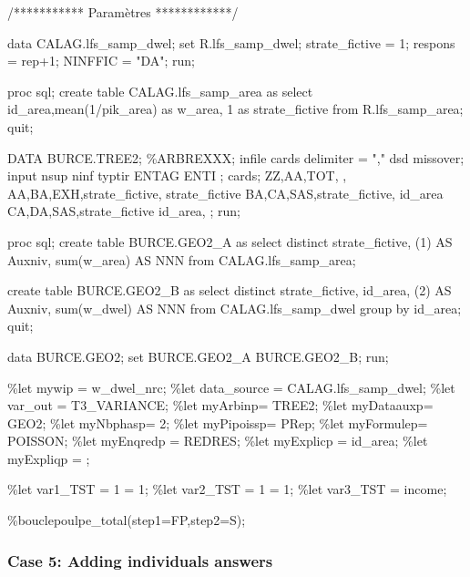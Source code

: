 \documentclass[
]{article}
\newenvironment{Shaded}{\begin{snugshade}}{\end{snugshade}}
\newcommand{\NormalTok}[1]{#1}
\begin{document}
\begin{Shaded}
\begin{Highlighting}[]
\NormalTok{/*********** Paramètres ************/}

\NormalTok{data CALAG.lfs\_samp\_dwel; set R.lfs\_samp\_dwel; }
\NormalTok{strate\_fictive = 1;}
\NormalTok{respons = rep+1;}
\NormalTok{NINFFIC = "DA";}
\NormalTok{run;}

\NormalTok{proc sql; create table CALAG.lfs\_samp\_area as select}
\NormalTok{id\_area,mean(1/pik\_area) as w\_area,}
\NormalTok{1 as strate\_fictive}
\NormalTok{from R.lfs\_samp\_area;}
\NormalTok{quit;}

\NormalTok{DATA BURCE.TREE2;   }
\NormalTok{\%ARBREXXX;}
\NormalTok{infile cards delimiter = "," dsd missover;}
\NormalTok{input nsup ninf typtir ENTAG ENTI ;}
\NormalTok{cards;   }
\NormalTok{ZZ,AA,TOT, ,   }
\NormalTok{AA,BA,EXH,strate\_fictive, strate\_fictive}
\NormalTok{BA,CA,SAS,strate\_fictive, id\_area}
\NormalTok{CA,DA,SAS,strate\_fictive id\_area,}
\NormalTok{;}
\NormalTok{run;}

\NormalTok{proc sql;}
\NormalTok{create table BURCE.GEO2\_A as select distinct}
\NormalTok{    strate\_fictive, (1) AS Auxniv, sum(w\_area) AS NNN}
\NormalTok{from CALAG.lfs\_samp\_area;}

\NormalTok{create table BURCE.GEO2\_B as select distinct}
\NormalTok{    strate\_fictive, id\_area, (2) AS Auxniv, sum(w\_dwel) AS NNN}
\NormalTok{from CALAG.lfs\_samp\_dwel group by id\_area;}
\NormalTok{quit;}

\NormalTok{data BURCE.GEO2; set BURCE.GEO2\_A BURCE.GEO2\_B; run;}

\NormalTok{\%let mywip = w\_dwel\_nrc;}
\NormalTok{\%let data\_source = CALAG.lfs\_samp\_dwel;}
\NormalTok{\%let var\_out = T3\_VARIANCE;}
\NormalTok{\%let myArbinp=  TREE2;}
\NormalTok{\%let myDataauxp= GEO2;}
\NormalTok{\%let myNbphasp=  2;}
\NormalTok{\%let myPipoissp= PRep;}
\NormalTok{\%let myFormulep= POISSON;}
\NormalTok{\%let myEnqredp = REDRES;}
\NormalTok{\%let myExplicp = id\_area;}
\NormalTok{\%let myExpliqp = ;}

\NormalTok{\%let var1\_TST = 1 = 1;}
\NormalTok{\%let var2\_TST = 1 = 1;}
\NormalTok{\%let var3\_TST = income;}

\NormalTok{\%bouclepoulpe\_total(step1=FP,step2=S);}
\end{Highlighting}
\end{Shaded}

\subsubsection{Case 5: Adding individuals
answers}\label{case-5-adding-individuals-answers-1}
\end{document}
